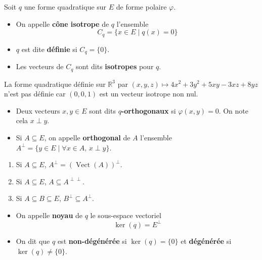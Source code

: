   Soit $q$ une forme quadratique sur $E$ de forme polaire $\varphi$.

  \begin{definition}
    \begin{itemize}
      \item On appelle \textbf{cône isotrope} de $q$ l'ensemble
      \[ C_q = \{ x \in E \mid q(x) = 0 \} \]
      \item $q$ est dite \textbf{définie} si $C_q = \{ 0 \}$.
      \item Les vecteurs de $C_q$ sont dits \textbf{isotropes} pour $q$.
    \end{itemize}
  \end{definition}


  \begin{example}
    La forme quadratique définie sur $\mathbb{R}^3$ par $(x, y, z) \mapsto 4x^2 + 3y^2 + 5xy - 3xz + 8yz$ n'est pas définie car $(0,0,1)$ est un vecteur isotrope non nul.
  \end{example}


  \begin{definition}
    \begin{itemize}
      \item Deux vecteurs $x, y \in E$ sont dits \textbf{$q$-orthogonaux} si $\varphi(x, y) = 0$. On note cela $x \perp y$.
      \item Si $A \subseteq E$, on appelle \textbf{orthogonal} de $A$ l'ensemble $A^\perp = \{ y \in E \mid \forall x \in A, \, x \perp y \}$.
    \end{itemize}
  \end{definition}

  \begin{proposition}
    \begin{enumerate}[label=(\roman*)]
      \item Si $A \subseteq E$, $A^\perp = (\operatorname{Vect}(A))^\perp$.
      \item Si $A \subseteq E$, $A \subseteq A^{\perp\perp}$.
      \item Si $A \subseteq B \subseteq E$, $B^{\perp} \subseteq A^{\perp}$.
    \end{enumerate}
  \end{proposition}

  \begin{definition}
    \begin{itemize}
      \item On appelle \textbf{noyau} de $q$ le sous-espace vectoriel
      \[ \ker(q) = E^{\perp} \]
      \item On dit que $q$ est \textbf{non-dégénérée} si $\ker(q) = \{ 0 \}$ et \textbf{dégénérée} si $\ker(q) \neq \{ 0 \}$.
    \end{itemize}
  \end{definition}

